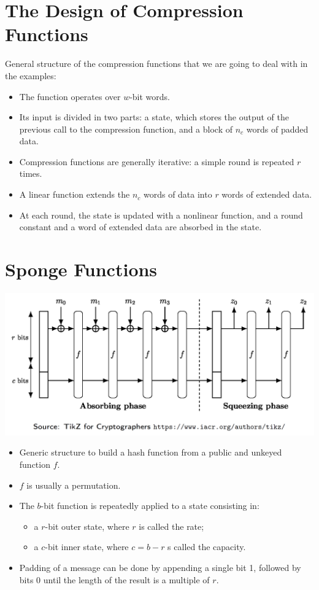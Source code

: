 \section{The Design of Compression Functions}
	General structure of the compression functions that we are going to deal with in the examples:
	\begin{itemize}
	    \item The function operates over $w$-bit words.
	    \item Its input is divided in two parts: a state, which stores the output of the previous call to the compression function, and a block of $n_c$ words of padded data.
	    \item Compression functions are generally iterative: a simple round is repeated $r$ times.
	    \item A linear function extends the $n_c$ words of data into $r$ words of extended data.
	    \item At each round, the state is updated with a nonlinear function, and a round constant and a word of extended data are absorbed in the state.
	\end{itemize}


\section{Sponge Functions}
   	\begin{center}
		\includegraphics[width=140mm]{Graphics/Hash Functions/hf6.png}
	\end{center}
    \begin{itemize}
        \item Generic structure to build a hash function from a public and unkeyed function $f$.
        \item $f$ is usually a permutation.
        \item The $b$-bit function is repeatedly applied to a state consisting in:
        \begin{itemize}
            \item a $r$-bit outer state, where $r$ is called the rate;
            \item a $c$-bit inner state, where $c=b-r$ s called the capacity.
        \end{itemize}
        \item Padding of a message can be done by appending a single bit 1, followed by bits 0 until the length of the result is a multiple of $r$.
    \end{itemize}

